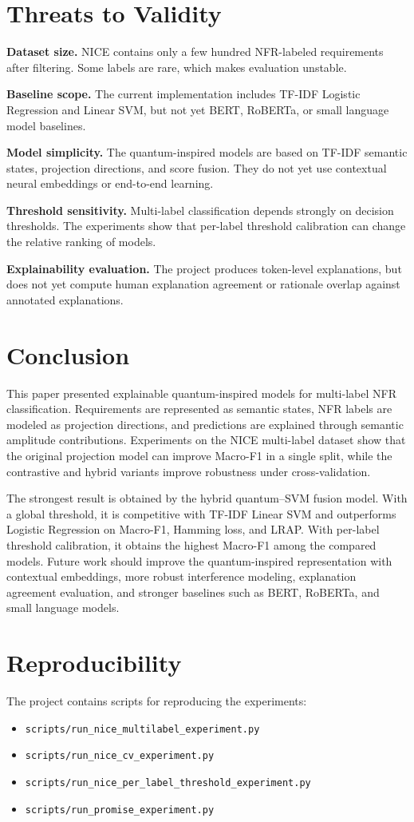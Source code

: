 \documentclass[conference]{IEEEtran}
\begin{document}
\section{Threats to Validity}
\textbf{Dataset size.} NICE contains only a few hundred NFR-labeled requirements after filtering. Some labels are rare, which makes evaluation unstable.

\textbf{Baseline scope.} The current implementation includes TF-IDF Logistic Regression and Linear SVM, but not yet BERT, RoBERTa, or small language model baselines.

\textbf{Model simplicity.} The quantum-inspired models are based on TF-IDF semantic states, projection directions, and score fusion. They do not yet use contextual neural embeddings or end-to-end learning.

\textbf{Threshold sensitivity.} Multi-label classification depends strongly on decision thresholds. The experiments show that per-label threshold calibration can change the relative ranking of models.

\textbf{Explainability evaluation.} The project produces token-level explanations, but does not yet compute human explanation agreement or rationale overlap against annotated explanations.

\section{Conclusion}
This paper presented explainable quantum-inspired models for multi-label NFR classification. Requirements are represented as semantic states, NFR labels are modeled as projection directions, and predictions are explained through semantic amplitude contributions. Experiments on the NICE multi-label dataset show that the original projection model can improve Macro-F1 in a single split, while the contrastive and hybrid variants improve robustness under cross-validation.

The strongest result is obtained by the hybrid quantum--SVM fusion model. With a global threshold, it is competitive with TF-IDF Linear SVM and outperforms Logistic Regression on Macro-F1, Hamming loss, and LRAP. With per-label threshold calibration, it obtains the highest Macro-F1 among the compared models. Future work should improve the quantum-inspired representation with contextual embeddings, more robust interference modeling, explanation agreement evaluation, and stronger baselines such as BERT, RoBERTa, and small language models.

\section*{Reproducibility}
The project contains scripts for reproducing the experiments:
\begin{itemize}
    \item \texttt{scripts/run\_nice\_multilabel\_experiment.py}
    \item \texttt{scripts/run\_nice\_cv\_experiment.py}
    \item \texttt{scripts/run\_nice\_per\_label\_threshold\_experiment.py}
    \item \texttt{scripts/run\_promise\_experiment.py}
\end{itemize}



\end{document}
